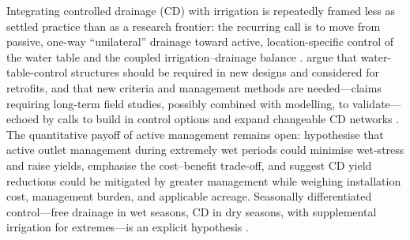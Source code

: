 \documentclass[11pt]{article}
\begin{document}
Integrating controlled drainage (CD) with irrigation is repeatedly framed less as
settled practice than as a research frontier: the recurring call is to move from
passive, one-way ``unilateral'' drainage toward active, location-specific control
of the water table and the coupled irrigation--drainage balance
\parencite{Ayars2006b,Kesicka2023b,Ritzema2023}. \textcite{Ayars2006b} argue that
water-table-control structures should be required in new designs and considered
for retrofits, and that new criteria and management methods are needed---claims
requiring long-term field studies, possibly combined with modelling, to
validate---echoed by calls to build in control options and expand changeable CD
networks \parencite{Dukhovny2018,Mahmoud2021,Strock2011}. The quantitative payoff
of active management remains open: \textcite{Watkins2024} hypothesise that active
outlet management during extremely wet periods could minimise wet-stress and raise
yields, \textcite{Saadat2017} emphasise the cost--benefit trade-off, and
\textcite{Helmers2012} suggest CD yield reductions could be mitigated by greater
management while weighing installation cost, management burden, and applicable
acreage. Seasonally differentiated control---free drainage in wet seasons, CD in
dry seasons, with supplemental irrigation for extremes---is an explicit hypothesis
\parencite{Asgari2021}.
\end{document}
